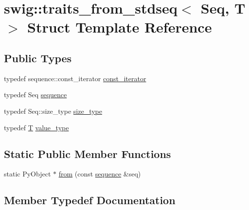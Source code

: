 \hypertarget{structswig_1_1traits__from__stdseq}{}\section{swig\+:\+:traits\+\_\+from\+\_\+stdseq$<$ Seq, T $>$ Struct Template Reference}
\label{structswig_1_1traits__from__stdseq}
\subsection*{Public Types}
\begin{DoxyCompactItemize}
\item 
typedef sequence\+::const\+\_\+iterator \hyperlink{structswig_1_1traits__from__stdseq_ab1c085e18d48f5f0afe549b4dc885290}{const\+\_\+iterator}
\item 
typedef Seq \hyperlink{structswig_1_1traits__from__stdseq_ad784f89c80055794b0da097a644ab7ab}{sequence}
\item 
typedef Seq\+::size\+\_\+type \hyperlink{structswig_1_1traits__from__stdseq_a1189d4a7cea9e522a7c10ed7ff2ce232}{size\+\_\+type}
\item 
typedef \hyperlink{fmt_8h_a0acb682b8260ab1c60b918599864e2e5}{T} \hyperlink{structswig_1_1traits__from__stdseq_a2159701c1eaadbf75d9b3014fea48706}{value\+\_\+type}
\end{DoxyCompactItemize}
\subsection*{Static Public Member Functions}
\begin{DoxyCompactItemize}
\item 
static Py\+Object $\ast$ \hyperlink{structswig_1_1traits__from__stdseq_ab65e9ff3dbb76a137536483c6121584b}{from} (const \hyperlink{structswig_1_1traits__from__stdseq_ad784f89c80055794b0da097a644ab7ab}{sequence} \&seq)
\end{DoxyCompactItemize}


\subsection{Member Typedef Documentation}
\mbox{\label{structswig_1_1traits__from__stdseq_ab1c085e18d48f5f0afe549b4dc885290}} 
